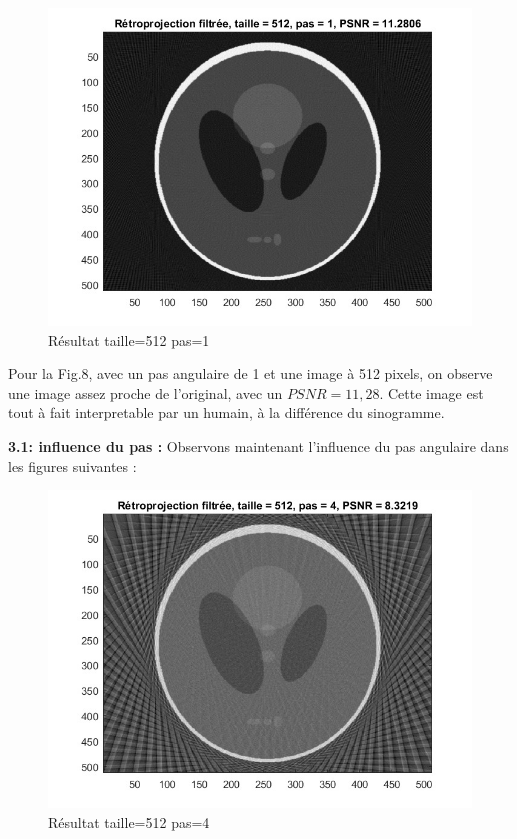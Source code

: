 \documentclass[conference]{IEEEtran}
\begin{document}
\begin{figure}[H]
\centering
\includegraphics[scale=0.5]{t512-p1}
	\caption[Résultat taille=512 pas=1]{Résultat taille=512 pas=1}
\label{fig:gallery}
\end{figure}

Pour la Fig.8, avec un pas angulaire de 1 et une image à 512 pixels, on observe une image assez proche de l'original, avec un $PSNR=11,28$. Cette image est tout à fait interpretable par un humain, à la différence du sinogramme.

\textbf{3.1: influence du pas :}
Observons maintenant l'influence du pas angulaire dans les figures suivantes :

\begin{figure}[H]
\centering
\includegraphics[scale=0.5]{t512-p4}
	\caption[Résultat taille=512 pas=4]{Résultat taille=512 pas=4}
\label{fig:gallery}
\end{figure}
\end{document}
